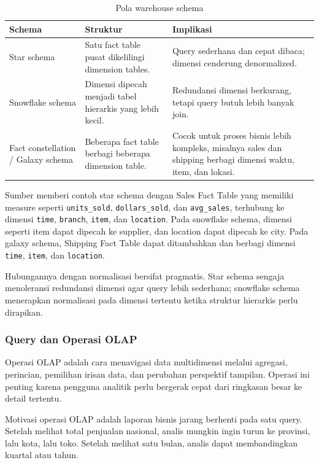 \begin{table}[H]
\centering
\begin{tabularx}{\textwidth}{|L{0.22\textwidth}|X|X|}
\hline
\textbf{Schema} & \textbf{Struktur} & \textbf{Implikasi} \\
\hline
Star schema & Satu fact table pusat dikelilingi dimension tables. & Query sederhana dan cepat dibaca; dimensi cenderung denormalized. \\
\hline
Snowflake schema & Dimensi dipecah menjadi tabel hierarkis yang lebih kecil. & Redundansi dimensi berkurang, tetapi query butuh lebih banyak join. \\
\hline
Fact constellation / Galaxy schema & Beberapa fact table berbagi beberapa dimension table. & Cocok untuk proses bisnis lebih kompleks, misalnya sales dan shipping berbagi dimensi waktu, item, dan lokasi. \\
\hline
\end{tabularx}
\caption{Pola warehouse schema}
\label{tab:warehouse-schema}
\end{table}

Sumber memberi contoh star schema dengan Sales Fact Table yang memiliki measure seperti \texttt{units\_sold}, \texttt{dollars\_sold}, dan \texttt{avg\_sales}, terhubung ke dimensi \texttt{time}, \texttt{branch}, \texttt{item}, dan \texttt{location}. Pada snowflake schema, dimensi seperti item dapat dipecah ke supplier, dan location dapat dipecah ke city. Pada galaxy schema, Shipping Fact Table dapat ditambahkan dan berbagi dimensi \texttt{time}, \texttt{item}, dan \texttt{location}.

Hubungannya dengan normalisasi bersifat pragmatis. Star schema sengaja menoleransi redundansi dimensi agar query lebih sederhana; snowflake schema menerapkan normalisasi pada dimensi tertentu ketika struktur hierarkis perlu dirapikan.

\subsubsection{Query dan Operasi OLAP}

\begin{jawab}
Operasi OLAP adalah cara menavigasi data multidimensi melalui agregasi, perincian, pemilihan irisan data, dan perubahan perspektif tampilan. Operasi ini penting karena pengguna analitik perlu bergerak cepat dari ringkasan besar ke detail tertentu.
\end{jawab}

Motivasi operasi OLAP adalah laporan bisnis jarang berhenti pada satu query. Setelah melihat total penjualan nasional, analis mungkin ingin turun ke provinsi, lalu kota, lalu toko. Setelah melihat satu bulan, analis dapat membandingkan kuartal atau tahun.

